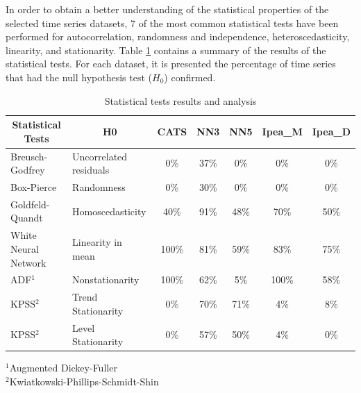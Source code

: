 \documentclass[11pt]{dippg}
\begin{document}
In order to obtain a better understanding of the statistical properties of the selected time series datasets, 7 of the most common statistical tests have been performed for autocorrelation, randomness and independence, heteroscedasticity, linearity, and stationarity. Table \ref{tb:statsprop} contains a summary of the results of the statistical tests. For each dataset, it is presented the percentage of time series that had the null hypothesis test ($H_0$) confirmed.

\begin{table}[!ht]
    \centering
    \caption{Statistical tests results and analysis}
    \label{tb:statsprop}
        \begin{center}
\setlength{\tabcolsep}{4pt}
            \begin{tabular}{@{}llccccc@{}}
                \toprule
                \multicolumn{1}{c}{Statistical Tests} & \multicolumn{1}{c}{H0} & \multicolumn{1}{c}{CATS} & \multicolumn{1}{c}{NN3} & \multicolumn{1}{c}{NN5} & \multicolumn{1}{c}{Ipea\_M} & \multicolumn{1}{c}{Ipea\_D} \\ \midrule
                Breusch-Godfrey & Uncorrelated residuals & 0\% & 37\% & 0\% & 0\% & 0\% \\
                Box-Pierce & Randomness & 0\% & 30\% & 0\% & 0\% & 0\% \\
                Goldfeld-Quandt & Homoscedasticity & 40\% & 91\% & 48\% & 70\% & 50\% \\
                White Neural Network & Linearity in mean & 100\% & 81\% & 59\% & 83\% & 75\% \\
                ADF$^1$ & Nonstationarity & 100\% & 62\% & 5\% & 100\% & 58\% \\
                KPSS$^2$ & Trend Stationarity & 0\% & 70\% & 71\% & 4\% & 8\% \\
                KPSS$^2$ & Level Stationarity & 0\% & 57\% & 50\% & 4\% & 0\% \\ \bottomrule
            \end{tabular}
        \end{center}
        \footnotesize\emph{$^1$}Augmented Dickey-Fuller\\
        \emph{$^2$}Kwiatkowski-Phillips-Schmidt-Shin
\end{table}
\end{document}
